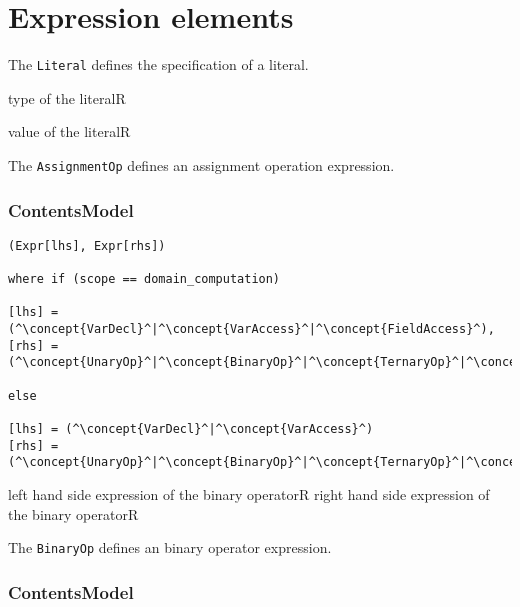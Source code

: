 \section{Expression elements}


The {\tt Literal} defines the specification of a literal. 

\begin{HIRChildElements}
	{type of the literal}{R}
\end{HIRChildElements}

\begin{HIRAttributes}
	{value of the literal}{R}
\end{HIRAttributes}


The {\tt AssignmentOp} defines an assignment operation expression. 

\subsubsection*{ContentsModel}{}

\begin{lstlisting}[style=default]
(Expr[lhs], Expr[rhs])

where if (scope == domain_computation)

[lhs] = (^\concept{VarDecl}^|^\concept{VarAccess}^|^\concept{FieldAccess}^),
[rhs] =	(^\concept{UnaryOp}^|^\concept{BinaryOp}^|^\concept{TernaryOp}^|^\concept{Literal}^|^\concept{FieldAccess}^)

else

[lhs] = (^\concept{VarDecl}^|^\concept{VarAccess}^)
[rhs] =	(^\concept{UnaryOp}^|^\concept{BinaryOp}^|^\concept{TernaryOp}^|^\concept{Literal}^)
\end{lstlisting}


\begin{HIRChildElements}
	\HIRElementDef{[lhs]}
	{left hand side expression of the binary operator}{R}
	\HIRElementDef{[rhs]}
	{right hand side expression of the binary operator}{R}
\end{HIRChildElements}



The {\tt BinaryOp} defines an binary operator expression.

\subsubsection*{ContentsModel}{}


